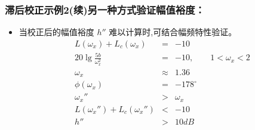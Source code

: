 \documentclass[table]{beamer}
\begin{document}
\begin{frame}
\frametitle{滞后校正示例2(续)另一种方式验证幅值裕度：}
\label{sec-2-6}

\begin{itemize}
\item 当校正后的幅值裕度  $h''$ 难以计算时,可结合幅频特性验证。
     \begin{eqnarray*}
     L(\omega_x)+L_c(\omega_x) &=& -10 \\
     20\lg\frac{5b}{\omega_x^2} &=& -10, \qquad 1<\omega_x<2 \\
     \omega_x &\approx& 1.36 \\
     \phi(\omega_x) & = & -178^{\circ} \\
     \omega_x'' &>& \omega_x \\
     L(\omega_x'')+L_c(\omega_x'') &<& -10 \\
     h'' &>& 10dB
     \end{eqnarray*}
\end{itemize}
\end{frame}
\end{document}
